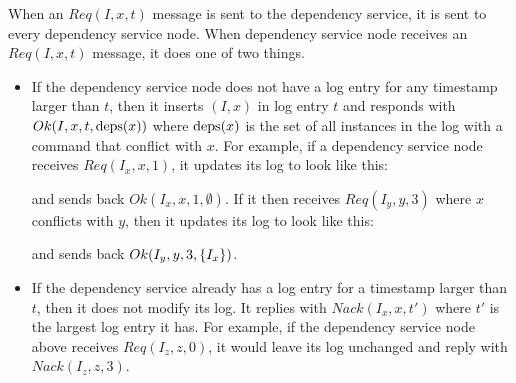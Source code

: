 When an $Req(I, x, t)$ message is sent to the dependency service, it is sent to
every dependency service node. When dependency service node receives an $Req(I,
x, t)$ message, it does one of two things.
\begin{itemize}
  \item
    If the dependency service node does not have a log entry for any timestamp
    larger than $t$, then it inserts $(I,x)$ in log entry $t$ and responds with
    $Ok(I,x,t,\text{deps}(x))$ where $\text{deps}(x)$ is the set of all instances in the
    log with a command that conflict with $x$. For example, if a dependency
    service node receives $Req(I_x, x, 1)$, it updates its log to look like
    this:

    \begin{center}
    \end{center}

    and sends back $Ok(I_x, x, 1, \emptyset{})$. If it then receives $Req(I_y,
    y, 3)$ where $x$ conflicts with $y$, then it updates its log to look like
    this:

    \begin{center}
    \end{center}

    and sends back $Ok(I_y, y, 3, \{I_x\})$.

  \item
    If the dependency service already has a log entry for a timestamp larger
    than $t$, then it does not modify its log. It replies with $Nack(I_x, x,
    t')$ where $t'$ is the largest log entry it has. For example, if the
    dependency service node above receives $Req(I_z, z, 0)$, it would leave its
    log unchanged and reply with $Nack(I_z, z, 3)$.
\end{itemize}


